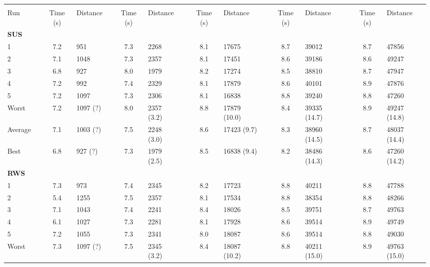 \begin{sidewaystable}[hbpt]\centering
\footnotesize{
\begin{tabular} {l l S  l l S l l S l l S l l S l}
\toprule
&&  &&  &&   & & &&  \\          
Run & & {Time (s)} & Distance & & {Time (s)} & Distance && {Time (s)} & Distance && {Time (s)} & Distance && {Time (s)} & Distance \\ \midrule\addlinespace
\textbf{SUS} \\
1   &&  7.2 & 951 && 7.3 & 2268  && 8.1 & 17675  && 8.7 & 39012 && 8.7 & 47856 \\
2   &&  7.1 & 1048 && 7.3 & 2357  && 8.1 & 17451 && 8.6 & 39186 && 8.6 & 49247   \\
3   &&  6.8 & 927 && 8.0 & 1979 &&  8.2 & 17274 && 8.5 & 38810 && 8.7 & 47947    \\
4   &&  7.2 & 992 && 7.4& 2329  && 8.1  & 17879 && 8.6 & 40101 && 8.9 & 47876 \\
5   &&  7.2 & 1097 &&  7.3 & 2306  && 8.1 & 16838 && 8.8 & 39240 && 8.8 & 47260  \\ \addlinespace
Worst  &&  7.2 & 1097 (?) && 8.0 & 2357 (3.2) && 8.8 & 17879 (10.0) && 8.4 & 39335 (14.7) && 8.9 & 49247 (14.8)  \\
Average&&  7.1 & 1003 (?) && 7.5 & 2248 (3.0) && 8.6 & 17423 (9.7) && 8.3 & 38960 (14.5) && 8.7 & 48037 (14.4)    \\
Best   && 6.8 & 927 (?) && 7.3 & 1979 (2.5)  && 8.5 & 16838 (9.4)&& 8.2 & 38486 (14.3) && 8.6 & 47260 (14.2)      \\\midrule\addlinespace\addlinespace
\textbf{RWS} \\
1   &&  7.3 & 973 && 7.4 & 2345  && 8.2 & 17723  && 8.8 & 40211 && 8.8 & 47788 \\
2   &&  5.4 & 1255 && 7.5 & 2357  && 8.1 & 17534 && 8.8 & 38354 && 8.8 & 48266   \\
3   &&  7.1 & 1043 && 7.4 & 2241 &&  8.4 & 18026 && 8.5 & 39751 && 8.7 & 49763    \\
4   &&  6.1 & 1027 && 7.3& 2281  && 8.1  & 17928 && 8.6 & 39514 && 8.9 & 49749 \\
5   &&  7.2 & 1055 &&  7.3 & 2341  && 8.0 & 18087 && 8.6 & 39514 && 8.8 & 49030  \\ \addlinespace
Worst  &&  7.3 & 1097 (?) && 7.5& 2345 (3.2) && 8.4 &  18087 (10.2) && 8.8 & 40211 (15.0) && 8.9 & 49763 (15.0)  \\

\end{tabular}}
\end{sidewaystable}
